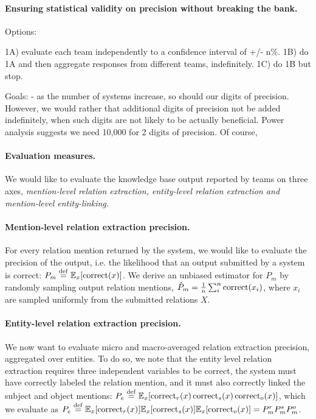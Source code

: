 \paragraph{Ensuring statistical validity on precision without breaking the bank.}

Options:

1A) evaluate each team independently to a confidence interval of +/- n\%.
1B) do 1A and then aggregate responses from different teams, indefinitely.
1C) do 1B but stop.

Goals:
- as the number of systems increase, so should our digits of precision. However, we would rather that additional digits of precision not be added indefinitely, when such digits are not likely to be actually beneficial.
Power analysis suggests we need 10,000 for 2 digits of precision. Of course, 
% 

\paragraph{Evaluation measures.} 
We would like to evaluate the knowledge base output reported by teams on three axes, \it{mention-level relation extraction}, \it{entity-level relation extraction} and \it{mention-level entity-linking}.

\paragraph{Mention-level relation extraction precision.}
For every relation mention returned by the system, we would like to evaluate the precision of the output, i.e. the likelihood that an output submitted by a system is correct: $P_m \stackrel{\rm def}{=} \mathbb{E}_{x}[\operatorname{correct}(x)]$.
We derive an unbiased estimator for $P_m$ by randomly sampling output relation mentions, $\hat{P}_m = \frac{1}{n} \sum_{i}^n \operatorname{correct}(x_i)$, where $x_i$ are sampled uniformly from the submitted relations $X$.

\paragraph{Entity-level relation extraction precision.}
We now want to evaluate micro and macro-averaged relation extraction precision, aggregated over entities. 
To do so, we note that the entity level relation extraction requires three independent variables to be correct, the system must have correctly labeled the relation mention, and it must also correctly linked the subject and object mentions: $P_e \stackrel{\rm def}{=} \mathbb{E}_{x}[ \operatorname{correct}_r(x) \operatorname{correct}_s(x) \operatorname{correct}_o(x)]$, which we evaluate as $P_e \stackrel{\rm def}{=} \mathbb{E}_{x}[\operatorname{correct}_r(x)] \mathbb{E}_{x}[\operatorname{correct}_s(x)]\mathbb{E}_{x}[ \operatorname{correct}_o(x)] = P^r_m P^s_m P^o_m$.

